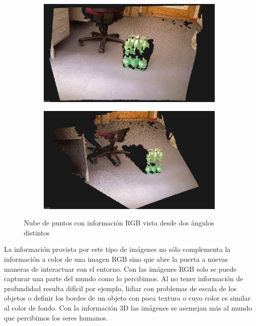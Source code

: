 \begin{figure}
	\centering
    \begin{subfigure}[b]{0.5\textwidth}
		\includegraphics[width=\textwidth]{img/nube_de_puntos_color_1.png}
	\end{subfigure}
	\begin{subfigure}[b]{0.5\textwidth}
		\includegraphics[width=\textwidth]{img/nube_de_puntos_color_2.png}
	\end{subfigure}
	\caption{Nube de puntos con información RGB vista desde dos ángulos distintos}
    \label{nube_de_puntos_color}
\end{figure}


La información provista por este tipo de imágenes no sólo complementa la información a color de una imagen RGB sino que abre la puerta a nuevas maneras de interactuar con el entorno. Con las imágenes RGB solo se puede capturar una parte del mundo como lo percibimos. Al no tener información de profundidad resulta difícil por ejemplo, lidiar con problemas de escala de los objetos o definir los bordes de un objeto con poca textura o cuyo color es similar al color de fondo. Con la información 3D las imágenes se asemejan más al mundo que percibimos los seres humanos.

